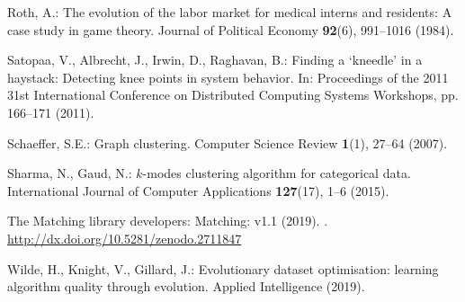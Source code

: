 \documentclass[smallextended]{svjour3}
\begin{document}
\begin{thebibliography}{10}
Roth, A.: The evolution of the labor market for medical interns and residents:
  A case study in game theory.
\newblock Journal of Political Economy \textbf{92}(6), 991--1016 (1984).
\newblock {}

Satopaa, V., Albrecht, J., Irwin, D., Raghavan, B.: Finding a `kneedle' in a
  haystack: Detecting knee points in system behavior.
\newblock In: Proceedings of the 2011 31st International Conference on
  Distributed Computing Systems Workshops, pp. 166--171 (2011).
\newblock {}

Schaeffer, S.E.: Graph clustering.
\newblock Computer Science Review \textbf{1}(1), 27--64 (2007).
\newblock {}

Sharma, N., Gaud, N.: $k$-modes clustering algorithm for categorical data.
\newblock International Journal of Computer Applications \textbf{127}(17), 1--6
  (2015).
\newblock {}

{The Matching library developers}: Matching: v1.1 (2019).
\newblock {}.
\newblock \urlprefix\url{http://dx.doi.org/10.5281/zenodo.2711847}

Wilde, H., Knight, V., Gillard, J.: Evolutionary dataset optimisation: learning
  algorithm quality through evolution.
\newblock Applied Intelligence  (2019).
\newblock {}

\end{thebibliography}
\end{document}
